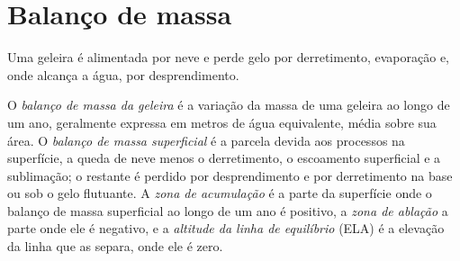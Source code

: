 \section{Balanço de massa}\label{sec:b3:glaciology:mass-balance}

Uma geleira é alimentada por neve e perde gelo por derretimento, evaporação e, onde
alcança a água, por desprendimento.

\begin{definition}\label{def:b3:glaciology:mass-balance}
O \emph{balanço de massa da geleira} é a variação
da massa de uma geleira ao longo de um ano, geralmente expressa em metros de água
equivalente, média sobre sua área. O \emph{balanço de massa
superficial} é a parcela devida aos processos na
superfície, a queda de neve menos o derretimento, o escoamento superficial e a sublimação; o restante é
perdido por desprendimento e por derretimento na base ou sob o gelo flutuante. A
\emph{zona de acumulação} é a parte da
superfície onde o balanço de massa superficial ao longo de um ano é positivo, a
\emph{zona de ablação} a parte onde ele é negativo,
e a \emph{altitude da linha de equilíbrio}
(ELA) é a elevação da linha que as separa, onde ele é zero.
\end{definition}

